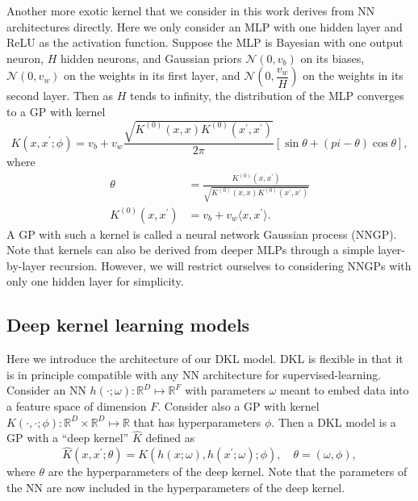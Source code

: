 \documentclass{article}
\newcommand{\RR}{\mathbb{R}}
\newcommand{\calN}{\mathcal{N}}
\begin{document}
Another more exotic kernel that we consider in this work derives from NN architectures directly. Here we only consider an MLP with one hidden layer and ReLU as the activation function. Suppose the MLP is Bayesian with one output neuron, $H$ hidden neurons, and Gaussian priors $\calN(0, v_b)$ on its biases, $\calN(0, v_w)$ on the weights in its first layer, and $\calN(0, \dfrac{v_w}{H})$ on the weights in its second layer. Then as $H$ tends to infinity, the distribution of the MLP converges to a GP with kernel
\begin{equation}
K(x, x^\prime; \phi) = v_b + v_w \frac{\sqrt{K^{(0)}(x, x)K^{(0)}(x^\prime, x^\prime)}}{2\pi} [\sin\theta + (pi-\theta)\cos\theta],
\end{equation}
where
\begin{align}
\theta &= \frac{K^{(0)}(x, x^\prime)}{\sqrt{K^{(0)}(x, x)K^{(0)}(x^\prime, x^\prime)}} \\
K^{(0)}(x, x^\prime) &= v_b + v_w\langle x, x^\prime\rangle.
\end{align}
A GP with such a kernel is called a neural network Gaussian process (NNGP). Note that kernels can also be derived from deeper MLPs through a simple layer-by-layer recursion. However, we will restrict ourselves to considering NNGPs with only one hidden layer for simplicity.

\subsection{Deep kernel learning models}

Here we introduce the architecture of our DKL model. DKL is flexible in that it is in principle compatible with any NN architecture for supervised-learning. Consider an NN $h(\cdot; \omega):\RR^D\mapsto \RR^F$ with parameters $\omega$ meant to embed data into a feature space of dimension $F$. Consider also a GP with kernel $K(\cdot, \cdot; \phi):\RR^D\times\RR^D\mapsto \RR$ that has hyperparameters $\phi$. Then a DKL model is a GP with a ``deep kernel'' $\hat{K}$ defined as
\begin{equation}
\hat{K}(x, x^\prime; \theta) = K(h(x; \omega), h(x^\prime; \omega); \phi),
\quad \theta = (\omega, \phi),
\end{equation}
where $\theta$ are the hyperparameters of the deep kernel. Note that the parameters of the NN are now included in the hyperparameters of the deep kernel.
\end{document}

